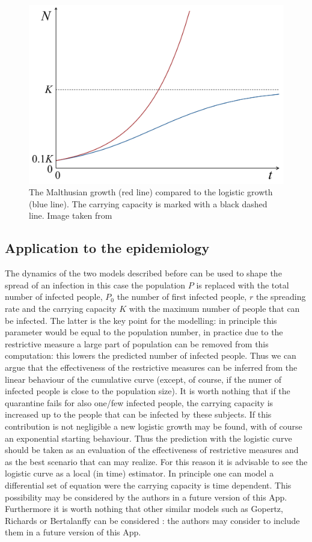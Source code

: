 \documentclass[
12pt, %
a4paper, %
oneside, %
headinclude,footinclude, %
BCOR5mm, %
]{scrartcl}
\begin{document}
\begin{figure}
 \centering
 \includegraphics[width=0.8\linewidth]{Figures/Malthusian_growth_vs_logistic_growth-2.jpg} 
 \caption{The Malthusian growth (red line) compared to the logistic growth (blue line). The carrying capacity is marked with a black dashed line. Image taken from \cite{malthus_vs_logistic}}
 \label{Malthusian_growth_vs_logistic_growth}
\end{figure}

\subsection{Application to the epidemiology}

The dynamics of the two models described before can be used to shape the spread of an infection \cite{serfling1952historical,ma2014estimating} in this case the population $P$ is replaced with the total number of infected people, $P_{0}$ the number of first infected people, $r$ the spreading rate and the carrying capacity $K$ with the maximum number of people that can be infected. The latter is the key point for the modelling: in principle this parameter would be equal to the population number, in practice due to the restrictive measure a large part of population can be removed from this computation: this lowers the predicted number of infected people. Thus we can argue that the effectiveness of the restrictive measures can be inferred from the linear behaviour of the cumulative curve (except, of course, if the numer of infected people is close to the population size). It is worth nothing that if the quarantine fails for also one/few infected people, the carrying capacity is increased up to the people that can be infected by these subjects. If this contribution is not negligible a new logistic growth may be found, with of course an exponential starting behaviour. Thus the prediction with the logistic curve should be taken as an evaluation of the effectiveness of restrictive measures and as the best scenario that can may realize. For this reason it is advisable to see the logistic curve as a local (in time) estimator. In principle one can model a differential set of equation were the carrying capacity is time dependent. This possibility may be considered  by the authors in a future version of this App. Furthermore it is worth nothing that other similar models such as Gopertz, Richards or Bertalanffy can be considered \cite{ma2014estimating} : the authors may consider to include them in  a future version of this App.
\end{document}
